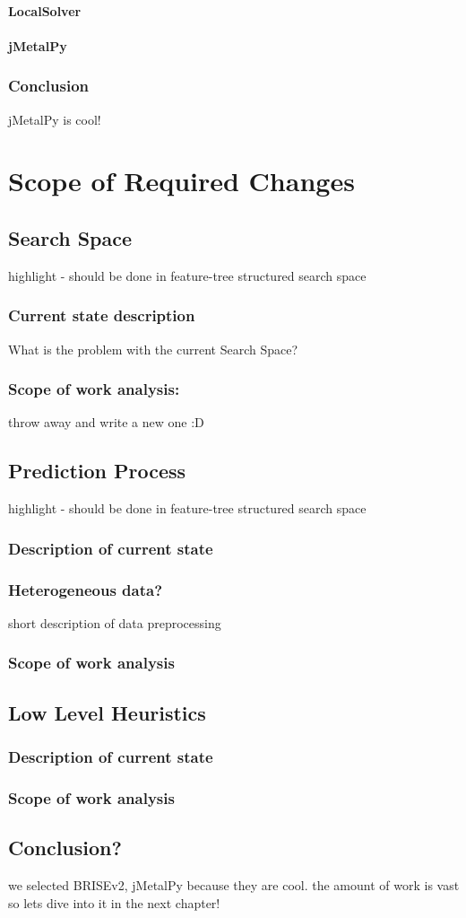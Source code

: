 \paragraph{LocalSolver}
\paragraph{jMetalPy}

\subsubsection{Conclusion}
jMetalPy is cool!


\section{Scope of Required Changes}\label{concept:changes analysis}

\subsection{Search Space} highlight - should be done in feature-tree structured search space
\subsubsection{Current state description} What is the problem with the current Search Space?
\subsubsection{Scope of work analysis:} throw away and write a new one :D

\subsection{Prediction Process} highlight - should be done in feature-tree structured search space
\subsubsection{Description of current state}
\subsubsection{Heterogeneous data?} short description of data preprocessing
\subsubsection{Scope of work analysis} 

\subsection{Low Level Heuristics}
\subsubsection{Description of current state}
\subsubsection{Scope of work analysis}

\subsection{Conclusion?}
we selected BRISEv2, jMetalPy because they are cool.
the amount of work is vast so lets dive into it in the next chapter!
